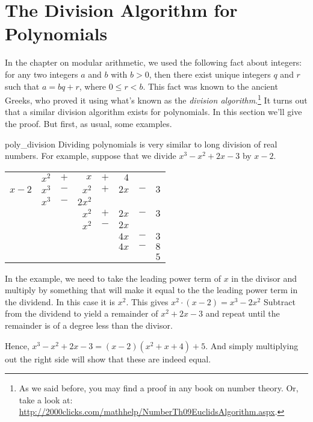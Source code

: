 \section{The Division Algorithm for Polynomials}
In the chapter on modular arithmetic, we used the following fact about integers: for any two integers $a$ and $b$  with $b > 0$, then there exist unique
integers $q$ and $r$ such that $a = bq+r$, where $0 \leq r < b$. This fact was known to the ancient Greeks, who proved it using what's known as the \emph{division algorithm}.\footnote{As we said before, you may find a proof in any book on number theory. Or, take a look at:  \url{http://2000clicks.com/mathhelp/NumberTh09EuclidsAlgorithm.aspx}.} It turns out that a similar
division algorithm exists for
polynomials. In this section we'll  give the proof. But first, as usual, some examples.

\begin{example}{poly_division} 
Dividing polynomials is very similar to long division of real numbers.  
 For example,
suppose that we divide $x^3 - x^2 + 2 x - 3$ by $x - 2$.  
\begin{center}
\begin{tabular}{rrcrcrcr}
        &  $x^2$  &  $+$  &      $x$  &  $+$  &    $4$  &       &       \\ \cline{2-8}
 \multicolumn{1}{r|}{$x - 2$}
        &  $x^3$  &  $-$  &    $x^2$  &  $+$  &  $2 x$  &  $-$  &  $3$  \\
        &  $x^3$  &  $-$  &  $2 x^2$  &       &         &       &       \\ \cline{2-8}
        &         &       &    $x^2$  &  $+$  &  $2 x$  &  $-$  &  $3$  \\
        &         &       &    $x^2$  &  $-$  &  $2 x$  &       &       \\ \cline{4-8}
        &         &       &           &       &  $4 x$  &  $-$  &  $3$  \\
        &         &       &           &       &  $4 x$  &  $-$  &  $8$  \\ \cline{6-8}
        &         &       &           &       &         &       &  $5$
\end{tabular}
\end{center}
In the example, we need to take the leading power term of $x$ in the divisor and multiply by something that will make it equal to the the leading power term in the dividend.  In this case it is $x^2$.  This gives $x^2\cdot(x-2) = x^3 - 2x^2$  Subtract from the dividend to yield a remainder of $x^2 + 2x - 3$ and repeat until the remainder is of a degree less than the divisor.
 
Hence, $x^3 - x^2 + 2 x - 3 = (x - 2) (x^2 + x + 4 ) + 5$.  And simply multiplying out the right side will show that these are indeed equal.
\end{example}

